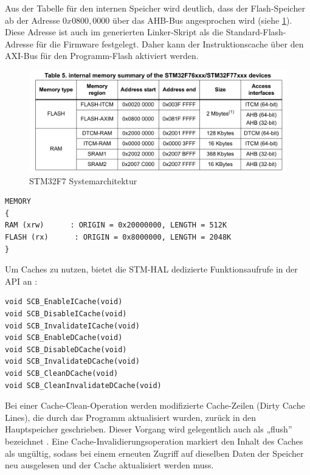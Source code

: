 Aus der Tabelle für den internen Speicher wird deutlich, dass der Flash-Speicher
ab der Adresse $0x0800,0000$ über das AHB-Bus angesprochen wird (siehe
\ref{fig:internal_mem_table}). Diese Adresse ist auch im generierten
Linker-Skript als die Standard-Flash-Adresse für die Firmware festgelegt. Daher
kann der Instruktionscache über den AXI-Bus für den Programm-Flash aktiviert
werden.

\begin{figure}[htb]
    \centering
    \includegraphics[width=1\textwidth]{assets/internal_mem_table}
    \caption{STM32F7 Systemarchitektur \cite[S. 14]{an4667}}
    \label{fig:internal_mem_table}
\end{figure}

\begin{code}
\begin{verbatim}
MEMORY
{
RAM (xrw)      : ORIGIN = 0x20000000, LENGTH = 512K
FLASH (rx)      : ORIGIN = 0x8000000, LENGTH = 2048K
}
\end{verbatim}
\end{code}

Um Caches zu nutzen, bietet die STM-\ac{HAL} dedizierte Funktionsaufrufe in der
API an \cite[S. 4]{an4839}:

\begin{code}
\begin{verbatim}
void SCB_EnableICache(void)
void SCB_DisableICache(void)
void SCB_InvalidateICache(void)
void SCB_EnableDCache(void)
void SCB_DisableDCache(void)
void SCB_InvalidateDCache(void)
void SCB_CleanDCache(void)
void SCB_CleanInvalidateDCache(void)
\end{verbatim}
\end{code}

Bei einer Cache-Clean-Operation werden modifizierte Cache-Zeilen (Dirty Cache
Lines), die durch das Programm aktualisiert wurden, zurück in den Hauptspeicher
geschrieben. Dieser Vorgang wird gelegentlich auch als „flush” bezeichnet
\cite[S. 4]{an4839}. Eine Cache-Invalidierungsoperation markiert den Inhalt des
Caches als ungültig, sodass bei einem erneuten Zugriff auf dieselben Daten der
Speicher neu ausgelesen und der Cache aktualisiert werden muss.

